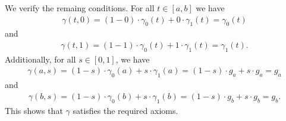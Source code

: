 \documentclass[11pt]{article}
\begin{document}
\begin{solution}
    We verify the remaing conditions. For all $t \in [a,b]$ we have 
    \begin{align}
        \gamma(t,0) = (1-0) \cdot \gamma_0(t) + 0 \cdot \gamma_1(t) = \gamma_0(t)
    \end{align}
    and 
    \begin{align}
        \gamma(t,1) = (1-1) \cdot \gamma_0(t) + 1 \cdot \gamma_1(t) = \gamma_1(t)
        .
    \end{align}
    Additionally, for all $s \in [0,1]$, we have 
    \begin{align}
        \gamma(a,s) = (1-s) \cdot \gamma_0(a) + s \cdot \gamma_1(a) = (1-s) \cdot g_a + s \cdot g_a = g_a
    \end{align}
    and 
    \begin{align}
        \gamma(b,s) = (1-s) \cdot \gamma_0(b) + s \cdot \gamma_1(b) = (1-s) \cdot g_b + s \cdot g_b = g_b
        .
    \end{align}
    This shows that $\gamma$ satisfies the required axioms.
\end{solution}
\end{document}
